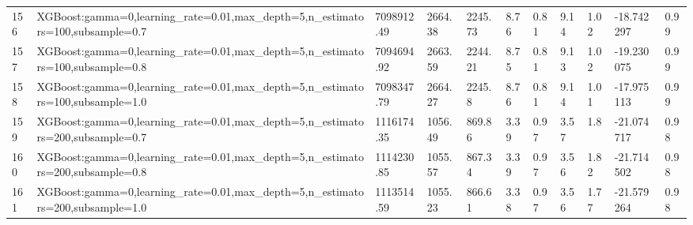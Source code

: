 \begin{longtable}{C{0.8cm} L{2cm} C{1.15cm} C{1.15cm} C{1.15cm} C{1.15cm} C{0.85cm} C{1.25cm} C{1.2cm} C{1.5cm} C{1.0cm}}
156 & XGBoost:\newline gamma=0,\newline learning\_rate=0.01,\newline max\_depth=5,\newline n\_estimators=100,\newline subsample=0.7 & 7098912.49 & 2664.38 & 2245.73 & 8.76 & 0.81 & 9.14 & 1.02 & -18.742297 & 0.99 \\
157 & XGBoost:\newline gamma=0,\newline learning\_rate=0.01,\newline max\_depth=5,\newline n\_estimators=100,\newline subsample=0.8 & 7094694.92 & 2663.59 & 2244.21 & 8.75 & 0.81 & 9.13 & 1.02 & -19.230075 & 0.99 \\
158 & XGBoost:\newline gamma=0,\newline learning\_rate=0.01,\newline max\_depth=5,\newline n\_estimators=100,\newline subsample=1.0 & 7098347.79 & 2664.27 & 2245.8 & 8.76 & 0.81 & 9.14 & 1.01 & -17.975113 & 0.99 \\
159 & XGBoost:\newline gamma=0,\newline learning\_rate=0.01,\newline max\_depth=5,\newline n\_estimators=200,\newline subsample=0.7 & 1116174.35 & 1056.49 & 869.86 & 3.39 & 0.97 & 3.57 & 1.8 & -21.074717 & 0.98 \\
160 & XGBoost:\newline gamma=0,\newline learning\_rate=0.01,\newline max\_depth=5,\newline n\_estimators=200,\newline subsample=0.8 & 1114230.85 & 1055.57 & 867.34 & 3.39 & 0.97 & 3.56 & 1.82 & -21.714502 & 0.98 \\
161 & XGBoost:\newline gamma=0,\newline learning\_rate=0.01,\newline max\_depth=5,\newline n\_estimators=200,\newline subsample=1.0 & 1113514.59 & 1055.23 & 866.61 & 3.38 & 0.97 & 3.56 & 1.77 & -21.579264 & 0.98 \\

\end{longtable}
